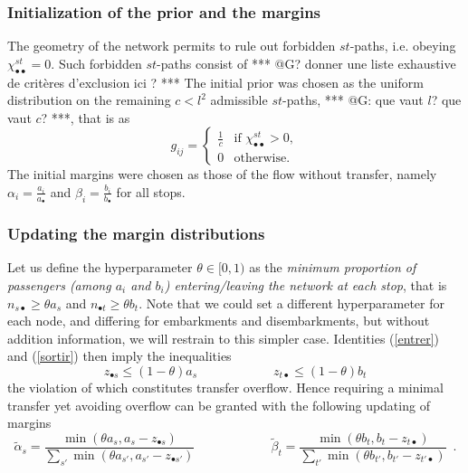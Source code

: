 \documentclass{bmcart}
\begin{document}
\subsubsection{Initialization of the prior and the margins}
The geometry of the network permits to rule out forbidden $st$-paths, i.e. obeying  $\chi^{st}_{\bullet\bullet}=0$. Such forbidden $st$-paths consist of *** @G? donner une liste exhaustive de critères d'exclusion ici ? ***  The initial prior was chosen as the uniform distribution on the remaining $c<l^2$ admissible $st$-paths, *** @G: que vaut $l$? que vaut $c$? ***,  that is as
\begin{equation*}
g_{ij} = \begin{cases}
  \frac{1}{c}    & \text{if $\chi^{st}_{\bullet\bullet}>0$}, \\
  0    & \text{otherwise}.
\end{cases}
\end{equation*}
The initial margins were chosen as  those of the flow without transfer, namely $\alpha_i=\frac{a_i}{a_{\bullet}}$ and $\beta_i=\frac{b_i}{b_\bullet}$ for all stops. 



\subsubsection{Updating  the margin distributions}
\label{marginup}
Let us define the hyperparameter $ \theta\in [0, 1)$ as the \emph{minimum proportion of passengers (among $a_i$ and $b_i$) entering/leaving the network at each stop}, that is $n_{s\bullet}\ge \theta a_s$ and $n_{\bullet t}\ge \theta b_t$. Note that we could set a different hyperparameter for each node, and differing for embarkments and disembarkments, but without addition information, we will restrain to this simpler case. Identities (\ref{entrer}) and  (\ref{sortir}) then imply the inequalities
\begin{displaymath}
z_{\bullet s} \le (1 - \theta) a_s\qquad\qquad \qquad z_{t \bullet} \le  (1 - \theta) b_t
\end{displaymath}
the violation of which constitutes transfer overflow. Hence requiring a minimal transfer yet avoiding overflow can be granted with the following updating of margins
\begin{equation}
\label{alpha_beta_update}
\widetilde{\alpha}_s = \frac{\min(\theta a_s, a_s - z_{\bullet s})}{\sum_{s'} \min(\theta a_{s'}, a_{s'} - z_{\bullet {s'}})}   \qquad \qquad \qquad
	\widetilde{\beta}_t = \frac{\min(\theta b_t, b_t - z_{t \bullet})}{\sum_{t'} \min(\theta b_{t'}, b_{t'} - z_{{t'} \bullet})}  \enspace. 
\end{equation}
 
\end{document}
